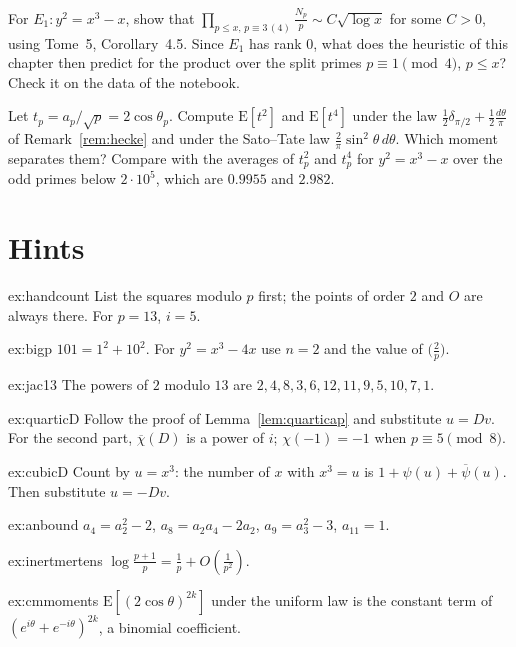 \begin{exercise}[$\star\star$]\label{ex:inertmertens}
For $E_1:y^2=x^3-x$, show that $\prod_{p\le x,\,p\equiv3\,(4)}\frac{N_p}p\sim C\sqrt{\log x}$ for some $C>0$, using Tome~5, Corollary~4.5. Since $E_1$ has rank
$0$, what does the heuristic of this chapter then predict for the product over the split primes $p\equiv1\pmod4$, $p\le x$? Check it on the data of the
notebook.
\end{exercise}

\begin{exercise}[$\star\star$]\label{ex:cmmoments}
Let $t_p=a_p/\sqrt p=2\cos\theta_p$. Compute $\mathrm E[t^2]$ and $\mathrm E[t^4]$ under the law $\frac12\delta_{\pi/2}+\frac12\frac{d\theta}\pi$ of
Remark~\ref{rem:hecke} and under the Sato--Tate law $\frac2\pi\sin^2\theta\,d\theta$. Which moment separates them? Compare with the averages of $t_p^2$ and $t_p^4$
for $y^2=x^3-x$ over the odd primes below $2\cdot10^5$, which are $0.9955$ and $2.982$.
\end{exercise}

\section{Hints}

\begin{hint}{ex:handcount}
List the squares modulo $p$ first; the points of order $2$ and $O$ are always there. For $p=13$, $i=5$.
\end{hint}
\begin{hint}{ex:bigp}
$101=1^2+10^2$. For $y^2=x^3-4x$ use $n=2$ and the value of $\bigl(\frac2p\bigr)$.
\end{hint}
\begin{hint}{ex:jac13}
The powers of $2$ modulo $13$ are $2,4,8,3,6,12,11,9,5,10,7,1$.
\end{hint}
\begin{hint}{ex:quarticD}
Follow the proof of Lemma~\ref{lem:quarticap} and substitute $u=Dv$. For the second part, $\overline\chi(D)$ is a power of $i$; $\chi(-1)=-1$ when
$p\equiv5\pmod8$.
\end{hint}
\begin{hint}{ex:cubicD}
Count by $u=x^3$: the number of $x$ with $x^3=u$ is $1+\psi(u)+\overline\psi(u)$. Then substitute $u=-Dv$.
\end{hint}
\begin{hint}{ex:anbound}
$a_4=a_2^2-2$, $a_8=a_2a_4-2a_2$, $a_9=a_3^2-3$, $a_{11}=1$.
\end{hint}
\begin{hint}{ex:inertmertens}
$\log\frac{p+1}p=\frac1p+O(\frac1{p^2})$.
\end{hint}
\begin{hint}{ex:cmmoments}
$\mathrm E[(2\cos\theta)^{2k}]$ under the uniform law is the constant term of $(e^{i\theta}+e^{-i\theta})^{2k}$, a binomial coefficient.
\end{hint}


